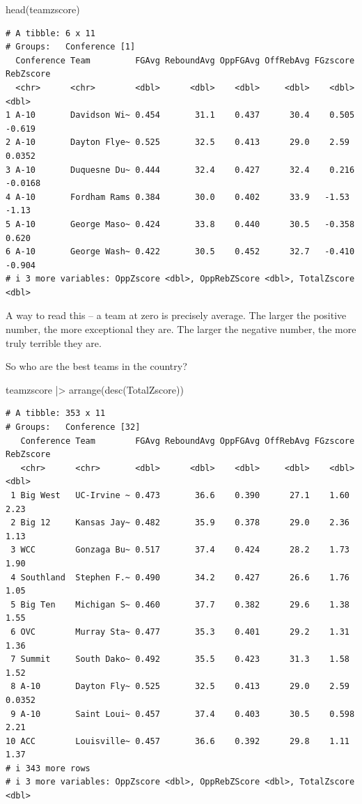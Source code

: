 \documentclass[
  letterpaper,
  DIV=11,
  numbers=noendperiod]{scrreprt}
\newenvironment{Shaded}{\begin{snugshade}}{\end{snugshade}}
\newcommand{\FunctionTok}[1]{\textcolor[rgb]{0.28,0.35,0.67}{#1}}
\newcommand{\NormalTok}[1]{\textcolor[rgb]{0.00,0.23,0.31}{#1}}
\newcommand{\SpecialCharTok}[1]{\textcolor[rgb]{0.37,0.37,0.37}{#1}}
\begin{document}
\begin{Shaded}
\begin{Highlighting}[]
\FunctionTok{head}\NormalTok{(teamzscore)}
\end{Highlighting}
\end{Shaded}

\begin{verbatim}
# A tibble: 6 x 11
# Groups:   Conference [1]
  Conference Team         FGAvg ReboundAvg OppFGAvg OffRebAvg FGzscore RebZscore
  <chr>      <chr>        <dbl>      <dbl>    <dbl>     <dbl>    <dbl>     <dbl>
1 A-10       Davidson Wi~ 0.454       31.1    0.437      30.4    0.505   -0.619 
2 A-10       Dayton Flye~ 0.525       32.5    0.413      29.0    2.59     0.0352
3 A-10       Duquesne Du~ 0.444       32.4    0.427      32.4    0.216   -0.0168
4 A-10       Fordham Rams 0.384       30.0    0.402      33.9   -1.53    -1.13  
5 A-10       George Maso~ 0.424       33.8    0.440      30.5   -0.358    0.620 
6 A-10       George Wash~ 0.422       30.5    0.452      32.7   -0.410   -0.904 
# i 3 more variables: OppZscore <dbl>, OppRebZScore <dbl>, TotalZscore <dbl>
\end{verbatim}

A way to read this -- a team at zero is precisely average. The larger
the positive number, the more exceptional they are. The larger the
negative number, the more truly terrible they are.

So who are the best teams in the country?

\begin{Shaded}
\begin{Highlighting}[]
\NormalTok{teamzscore }\SpecialCharTok{|\textgreater{}} \FunctionTok{arrange}\NormalTok{(}\FunctionTok{desc}\NormalTok{(TotalZscore))}
\end{Highlighting}
\end{Shaded}

\begin{verbatim}
# A tibble: 353 x 11
# Groups:   Conference [32]
   Conference Team        FGAvg ReboundAvg OppFGAvg OffRebAvg FGzscore RebZscore
   <chr>      <chr>       <dbl>      <dbl>    <dbl>     <dbl>    <dbl>     <dbl>
 1 Big West   UC-Irvine ~ 0.473       36.6    0.390      27.1    1.60     2.23  
 2 Big 12     Kansas Jay~ 0.482       35.9    0.378      29.0    2.36     1.13  
 3 WCC        Gonzaga Bu~ 0.517       37.4    0.424      28.2    1.73     1.90  
 4 Southland  Stephen F.~ 0.490       34.2    0.427      26.6    1.76     1.05  
 5 Big Ten    Michigan S~ 0.460       37.7    0.382      29.6    1.38     1.55  
 6 OVC        Murray Sta~ 0.477       35.3    0.401      29.2    1.31     1.36  
 7 Summit     South Dako~ 0.492       35.5    0.423      31.3    1.58     1.52  
 8 A-10       Dayton Fly~ 0.525       32.5    0.413      29.0    2.59     0.0352
 9 A-10       Saint Loui~ 0.457       37.4    0.403      30.5    0.598    2.21  
10 ACC        Louisville~ 0.457       36.6    0.392      29.8    1.11     1.37  
# i 343 more rows
# i 3 more variables: OppZscore <dbl>, OppRebZScore <dbl>, TotalZscore <dbl>
\end{verbatim}
\end{document}
